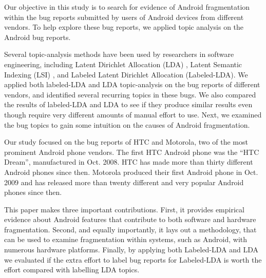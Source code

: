 \documentclass[10pt, conference, compsocconf]{IEEEtran}
\begin{document}
Our objective in this study is to search for evidence of
Android
fragmentation within the bug reports submitted by users of Android devices
from different vendors. To help explore these bug reports, we applied topic analysis on the
Android bug reports. 

Several topic-analysis methods have been used by researchers in
software engineering, including Latent Dirichlet Allocation (LDA)\cite{Asuncion:2010,Linstead:2009}
, Latent Semantic Indexing (LSI)\cite{Marcus04aninformation}
, and Labeled Latent Dirichlet Allocation
(Labeled-LDA)\cite{labeledlda}. We applied both
labeled-LDA and LDA topic-analysis on the bug reports
of different vendors, and identified several recurring topics in these
bugs. 
We also compared the results of labeled-LDA and LDA to see if they
produce similar results even though require very different amounts of
manual effort to use.
Next, we examined the bug topics to gain some intuition on the
causes of Android fragmentation.	

Our study focused on the bug reports of HTC and Motorola, two of the
most prominent Android phone vendors. The first HTC Android phone was
the ``HTC Dream'', manufactured in Oct. 2008. HTC has made more than
thirty different Android phones since then. Motorola produced their
first Android phone in Oct. 2009 and has released more than twenty
different and very popular Android phones since then. 
 
This paper makes three important contributions. First, it provides
empirical evidence about Android features that contribute to both software
and hardware fragmentation. Second, and equally importantly, it lays
out a methodology, that can be used to examine fragmentation within
systems, such as Android, with numerous hardware platforms. Finally,
by applying both Labeled-LDA and LDA we evaluated if the extra effort
to label bug reports for Labeled-LDA is worth the effort compared with
labelling LDA topics.
\end{document}
